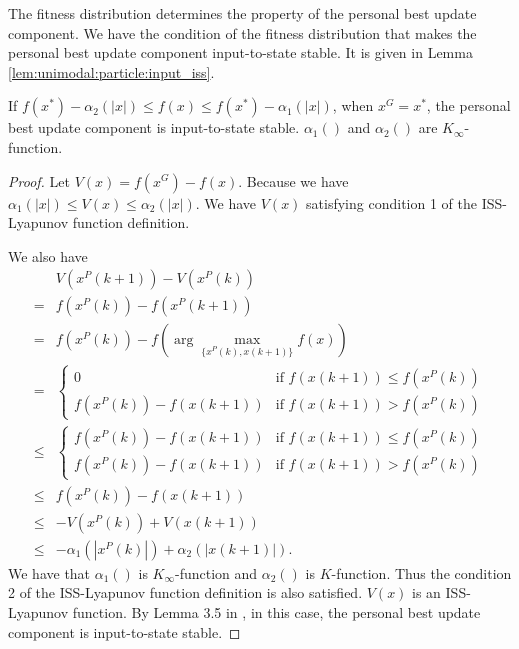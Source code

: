 The fitness distribution determines the property of the personal best update component.
We have the condition of the fitness distribution that makes the personal best update component input-to-state stable.
It is given in Lemma \ref{lem:unimodal:particle:input_iss}.

\begin{mylem}
\label{lem:unimodal:particle:input_iss}
If $ f(x^{*}) - \alpha_{2} ( |x| ) \leq  f(x) \leq f(x^{*}) - \alpha_{1} ( |x| ) $, when $ x^{G} = x^{*} $, the personal best update component is input-to-state stable.
$ \alpha_{1} () $ and $ \alpha_{2} () $ are $ K_{\infty} $-function.
\begin{proof}
Let $ V(x) = f(x^{G}) - f(x) $.
Because we have
$ \alpha_{1} ( |x| ) \leq V(x) \leq \alpha_{2} ( |x| )  $.
We have $ V (x) $ satisfying condition 1 of the ISS-Lyapunov function definition.

We also have
\begin{equation}
\begin{aligned}
& V(x^{P}(k+1)) - V(x^{P}(k)) \\
= & f(x^{P} (k)) - f(x^{P} (k+1)) \\
= & f(x^{P}(k)) - f( \arg \max_{ \{ x^{P}(k), x(k+1)  \} } f(x) )  \\
= & 
\left\{\begin{matrix}
0  & \mbox{if } f(x(k+1)) \leq f(x^{P}(k)) \\ 
f(x^{P}(k)) - f(x(k+1)) & \mbox{if } f(x(k+1)) > f(x^{P}(k))
\end{matrix}\right. \\
\leq & 
\left\{\begin{matrix}
f(x^{P}(k)) - f(x(k+1))  & \mbox{if } f(x(k+1)) \leq f(x^{P}(k)) \\ 
f(x^{P}(k)) - f(x(k+1)) & \mbox{if } f(x(k+1)) > f(x^{P}(k))
\end{matrix}\right. \\
\leq & f(x^{P}(k)) - f(x(k+1)) \\
\leq & - V(x^{P}(k)) + V(x(k+1)) \\
\leq & - \alpha_{1} ( | x^{P}(k) | ) + \alpha_{2} ( | x(k+1) | ).
\end{aligned}
\end{equation} 
We have that $ \alpha_{1} () $ is $ K_{\infty} $-function and $ \alpha_{2} () $ is $ K $-function.
Thus the condition 2 of the ISS-Lyapunov function definition is also satisfied.
$ V(x) $ is an ISS-Lyapunov function.
By Lemma 3.5 in \cite{Jiang2001857}, in this case, the personal best update component is input-to-state stable.
\end{proof}
\end{mylem}

